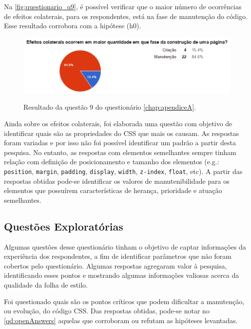 Na \autoref{fig:questionario_q9}, é possível verificar que o maior número de ocorrências de efeitos colaterais, para os respondentes, está na fase de manutenção do código. Esse resultado corrobora com a hipótese (h0).

\begin{figure}[!htb]
	\centering
	\caption{Resultado da questão 9 do questionário \autoref{chap:apendiceA}.}
	\includegraphics[width=1\textwidth]{./04-figuras/questionario_q9}
	\label{fig:questionario_q9}
\end{figure}

Ainda sobre os efeitos colaterais, foi elaborada uma questão com objetivo de identificar quais são as propriedades do CSS que mais os causam. As respostas foram variadas e por isso não foi possível identificar um padrão a partir desta pesquisa. No entanto, as respostas com elementos semelhantes sempre tinham relação com definição de posicionamento e tamanho dos elementos (e.g.: \texttt{position}, \texttt{margin}, \texttt{padding}, \texttt{display}, \texttt{width}, \texttt{z-index}, \texttt{float}, etc). A partir das respostas obtidas pode-se identificar os valores de manutenibilidade para os elementos que possuírem características de herança, prioridade e atuação semelhantes.

\subsection{Questões Exploratórias}

Algumas questões desse questionário tinham o objetivo de captar informações da experiência dos respondentes, a fim de identificar parâmetros que não foram cobertos pelo questionário. Algumas respostas agregaram valor à pesquisa, identificando esses pontos e mostrando algumas informações valiosas acerca da qualidade da folha de estilo. 

Foi questionado quais são os pontos críticos que podem dificultar a manutenção, ou evolução, do código CSS. Das respostas obtidas, pode-se notar no \autoref{qd:openAnswers} aquelas que corroboram ou refutam as hipóteses levantadas.

